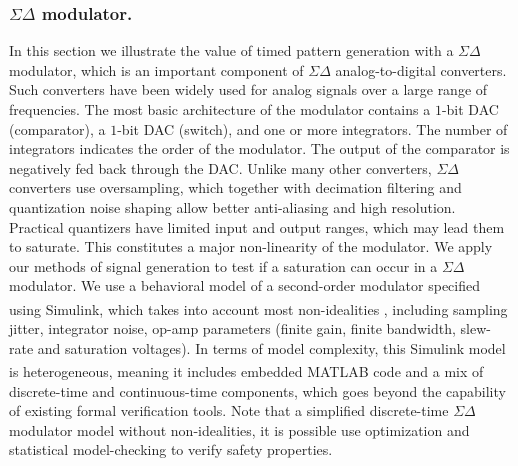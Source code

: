 \subsubsection{$\Sigma \Delta$ modulator.}

In this section we illustrate the value of timed pattern generation with a $\Sigma \Delta$ modulator, which is an important component of $\Sigma \Delta$ analog-to-digital converters. Such converters have been widely used for analog signals over a large range of frequencies. The most basic architecture of the modulator contains a $1$-bit DAC (comparator), a $1$-bit DAC (switch), and one or more integrators. The number of integrators indicates the order of the modulator. The output of the comparator is negatively fed back through the DAC. Unlike many other converters, $\Sigma \Delta$ converters use oversampling, which together with decimation filtering and quantization noise shaping allow better anti-aliasing and high resolution. Practical quantizers have limited input and output ranges, which may lead them to saturate. This constitutes a major non-linearity of the modulator. We apply our methods of signal generation to test if a saturation can occur in a $\Sigma \Delta$ modulator. We use a behavioral model of a second-order modulator specified using Simulink\textsuperscript{\textregistered}, which takes into account most non-idealities \cite{Brigati99}, including sampling jitter, integrator noise, op-amp parameters (finite gain, finite bandwidth, slew-rate and saturation voltages). In terms of model complexity, this Simulink model is heterogeneous, meaning it includes embedded MATLAB\textsuperscript{\textregistered} code and a mix of discrete-time and continuous-time components, which goes beyond the capability of existing formal verification tools. Note that a simplified discrete-time $\Sigma \Delta$ modulator model without non-idealities, it is possible use optimization \cite{DangDM04} and statistical model-checking \cite{ClarkeDL10} to verify safety properties.

